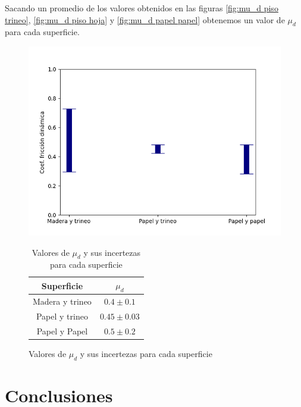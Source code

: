 \documentclass[12pt,a4]{article}
\begin{document}
Sacando un promedio de los valores obtenidos en las figuras \ref{fig:mu_d piso trineo}, \ref{fig:mu_d piso hoja} y \ref{fig:mu_d papel papel} obtenemos un valor de $\mu_d$ para cada superficie.

\begin{figure}[H]
    \begin{minipage}{0.5\textwidth}
        \centering
        \includegraphics[width=0.9\linewidth]{ud_Combined.png}
        \caption{Promedio de $\mu_d$ para cada superficie}
        \label{fig:mu_d promedio}
    \end{minipage}\hfill
    \begin{minipage}{0.5\textwidth}
        \centering
        \begin{table}[H]
            \centering
            \begin{tabular}{|c|c|}
                \hline
                \textbf{Superficie} & \textbf{$\mu_d$}\\
                \hline
                Madera y trineo & $0.4 \pm 0.1$\\
                Papel y trineo & $0.45 \pm 0.03$ \\
                Papel y Papel & $0.5 \pm 0.2$ \\
                \hline
            \end{tabular}
            \caption{Valores de $\mu_d$ y sus incertezas para cada superficie}
            \label{tab:mu_d}
        \end{table}
    \end{minipage}
\end{figure}

\section{Conclusiones}
\end{document}
